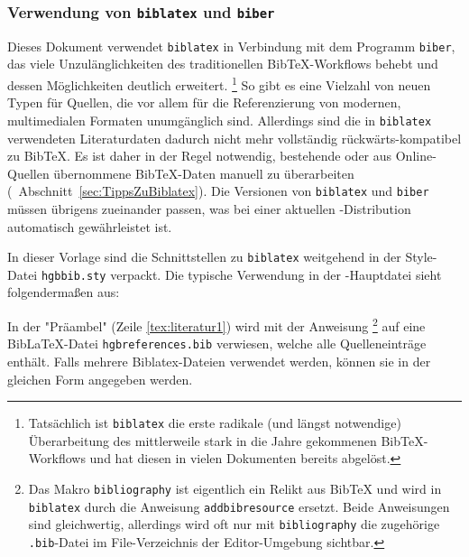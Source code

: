 \subsubsection{Verwendung von \texttt{biblatex} und \texttt{biber}}

Dieses Dokument verwendet \texttt{biblatex} in Verbindung mit dem Programm
\texttt{biber}, das viele Unzulänglichkeiten des
traditionellen BibTeX-Workflows behebt und dessen Möglichkeiten deutlich
erweitert.%
\footnote{Tatsächlich ist \texttt{biblatex} die erste radikale (und längst
notwendige) Überarbeitung des mittlerweile stark in die Jahre gekommenen
BibTeX-Workflows und hat diesen in vielen Dokumenten bereits abgelöst.}
So gibt es eine Vielzahl von neuen Typen für Quellen, die vor allem für die
Referenzierung von modernen, multimedialen Formaten unumgänglich sind.
Allerdings sind die in \texttt{biblatex} verwendeten Literaturdaten dadurch
nicht mehr vollständig rückwärts-kompatibel zu BibTeX. Es ist daher in der
Regel notwendig, bestehende oder aus Online-Quellen übernommene BibTeX-Daten
manuell zu überarbeiten (\sa\ Abschnitt~\ref{sec:TippsZuBiblatex}). Die
Versionen von \texttt{biblatex} und \texttt{biber} müssen übrigens zueinander
passen, was bei einer aktuellen \latex-Distribution automatisch gewährleistet
ist.

In dieser Vorlage sind die Schnittstellen zu \texttt{biblatex} weitgehend in
der Style-Datei \nolinkurl{hgbbib.sty} verpackt. Die typische Verwendung in
der \latex-Haupt\-datei sieht folgendermaßen aus:
%
%
In der "Präambel" (Zeile \ref{tex:literatur1}) wird mit der Anweisung
\verb!!%
\footnote{Das Makro \texttt{{\bs}bibliography} ist eigentlich ein Relikt aus
BibTeX und wird in \texttt{biblatex} durch die Anweisung
\texttt{{\bs}addbibresource} ersetzt. Beide Anweisungen sind gleichwertig,
allerdings wird oft nur mit \texttt{{\bs}bibliography} die zugehörige
\texttt{.bib}-Datei im File-Verzeichnis der Editor-Umgebung sichtbar.}
auf eine BibLaTeX-Datei \nolinkurl{hgbreferences.bib} verwiesen, welche alle
Quelleneinträge enthält.
Falls mehrere Bibla\-tex-Dateien verwendet werden, können sie in der gleichen
Form angegeben werden.

